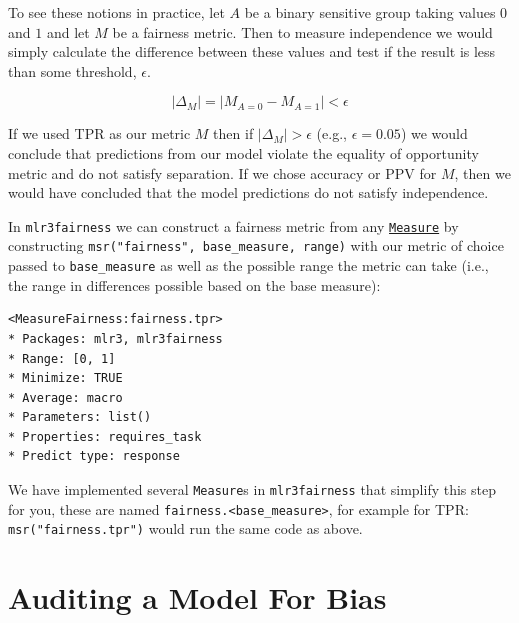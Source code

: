 To see these notions in practice, let \(A\) be a binary sensitive group
taking values \(0\) and \(1\) and let \(M\) be a fairness metric. Then
to measure independence we would simply calculate the difference between
these values and test if the result is less than some threshold,
\(\epsilon\).

\[
|\Delta_{M}| = |M_{A=0} - M_{A=1}| < \epsilon
\]

If we used TPR as our metric \(M\) then if \(|\Delta_{M}| > \epsilon\)
(e.g., \(\epsilon = 0.05\)) we would conclude that predictions from our
model violate the equality of opportunity metric and do not satisfy
separation. If we chose accuracy or PPV for \(M\), then we would have
concluded that the model predictions do not satisfy independence.

In \texttt{mlr3fairness} we can construct a fairness metric from any
\href{https://mlr3.mlr-org.com/reference/Measure.html}{\texttt{Measure}}
by constructing \texttt{msr("fairness",\ base\_measure,\ range)} with
our metric of choice passed to \texttt{base\_measure} as well as the
possible range the metric can take (i.e., the range in differences
possible based on the base measure):

\begin{Shaded}
\begin{Highlighting}[]
\OtherTok{=} \NormalTok{(}\NormalTok{, } \NormalTok{(}\NormalTok{),}
   \NormalTok{(}\NormalTok{, }\NormalTok{))}
\end{Highlighting}
\end{Shaded}

\begin{verbatim}
<MeasureFairness:fairness.tpr>
* Packages: mlr3, mlr3fairness
* Range: [0, 1]
* Minimize: TRUE
* Average: macro
* Parameters: list()
* Properties: requires_task
* Predict type: response
\end{verbatim}

We have implemented several \texttt{Measure}s in \texttt{mlr3fairness}
that simplify this step for you, these are named
\texttt{fairness.\textless{}base\_measure\textgreater{}}, for example
for TPR: \texttt{msr("fairness.tpr")} would run the same code as above.

\hypertarget{auditing-a-model-for-bias}{%
\section{Auditing a Model For Bias}\label{auditing-a-model-for-bias}}

